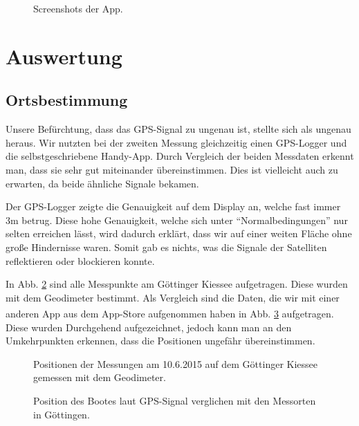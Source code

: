 \documentclass[12pt,a4paper,titlepage,headinclude,bibtotoc]{scrartcl}
\begin{document}
\begin{figure}[h]
  \caption{Screenshots der App.}
  \label{fig:appScreenshots}
\end{figure}


\section{Auswertung}
\label{sec:auswertung}

\subsection{Ortsbestimmung}

Unsere Befürchtung, dass das GPS-Signal zu ungenau ist, stellte sich als ungenau heraus.
Wir nutzten bei der zweiten Messung gleichzeitig einen GPS-Logger und die selbstgeschriebene Handy-App.
Durch Vergleich der beiden Messdaten erkennt man, dass sie sehr gut miteinander übereinstimmen.
Dies ist vielleicht auch zu erwarten, da beide ähnliche Signale bekamen.

Der GPS-Logger zeigte die Genauigkeit auf dem Display an, welche fast immer 3m betrug.
Diese hohe Genauigkeit, welche sich unter "`Normalbedingungen"' nur selten erreichen lässt, wird dadurch erklärt, dass wir auf einer weiten Fläche ohne große Hindernisse waren.
Somit gab es nichts, was die Signale der Satelliten reflektieren oder blockieren konnte.


In Abb. \ref{fig:einzelGPSGoe} sind alle Messpunkte am Göttinger Kiessee aufgetragen.
Diese wurden mit dem Geodimeter bestimmt.
Als Vergleich sind die Daten, die wir mit einer anderen App aus dem App-Store\textsuperscript{\textregistered}  aufgenommen haben in Abb. \ref{fig:GPSGoe} aufgetragen.
Diese wurden Durchgehend aufgezeichnet, jedoch kann man an den Umkehrpunkten erkennen, dass die Positionen ungefähr übereinstimmen.


\begin{figure}[h]
\centering

\caption{Positionen der Messungen am 10.6.2015 auf dem Göttinger Kiessee gemessen mit dem Geodimeter.}
\label{fig:einzelGPSGoe}
\end{figure}

\begin{figure}[h]
\centering

\caption{Position des Bootes laut GPS-Signal verglichen mit den Messorten in Göttingen.}
\label{fig:GPSGoe}
\end{figure}
\end{document}
